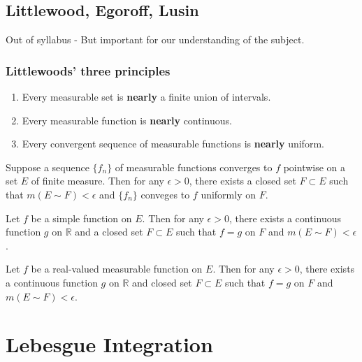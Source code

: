 {\color{violet}
\subsection{Littlewood, Egoroff, Lusin}
Out of syllabus - But important for our understanding of the subject.
\subsubsection{Littlewoods' three principles}
\begin{enumerate}
	\item Every measurable set is \textbf{nearly} a finite union of intervals.
	\item Every measurable function is \textbf{nearly} continuous.
	\item Every convergent sequence of measurable functions is \textbf{nearly} uniform.
\end{enumerate}
\begin{theorem}[Egoroff]
	Suppose a sequence $\{ f_n \}$ of measurable functions converges to $f$ pointwise on a set $E$ of finite measure.
	Then for any $\epsilon > 0$, there exists a closed set $F \subset E$ such that $m(E \sim F) < \epsilon$ and $\{ f_n \}$ conveges to $f$ uniformly on $F$.
\end{theorem}

\begin{theorem}
	Let $f$ be a simple function on $E$.
	Then for any $\epsilon > 0$, there exists a continuous function $g$ on $\mathbb{R}$ and a closed set $F \subset E$ such that $f =g$ on $F$ and $m(E \sim F) < \epsilon$.
\end{theorem}

\begin{theorem}[Lusin]
	Let $f$ be a real-valued measurable function on $E$.
	Then for any $\epsilon > 0$, there exists a continuous function $g$ on $\mathbb{R}$ and closed set $F \subset E$ such that $f=g$ on $F$ and $m(E \sim F) < \epsilon$.
\end{theorem}
}
\section{Lebesgue Integration}
